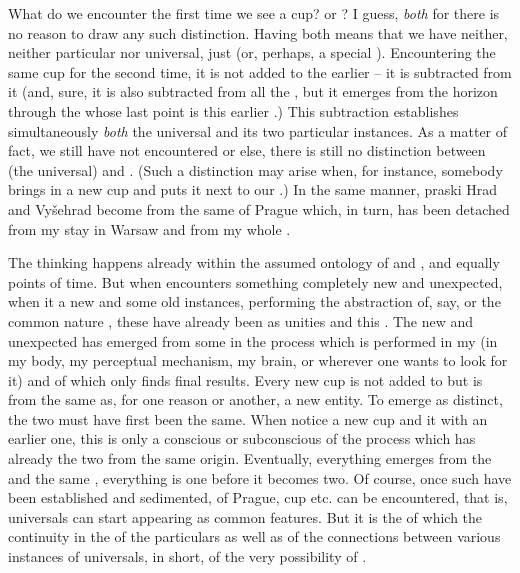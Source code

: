 What do we encounter the first time we see a cup?  or ?
I guess, {\em both} for there is no reason to draw any such distinction. Having
both means that we have neither, neither particular nor universal, just
 (or, perhaps, a special ). Encountering the same cup for the
second time, it is not added to 
the earlier  -- it is subtracted from it (and, sure, it is also
subtracted from all the , but it emerges from the horizon through the
 whose last point is this earlier .)
This subtraction
establishes simultaneously {\em both} the universal  and its two
particular instances.  As a matter of fact, we still have not encountered
 or else, there is still no distinction between (the universal)
 and . (Such a distinction may arise when, for instance,
somebody brings in a new cup and puts it next to our .)  
In the same manner, praski Hrad and Vy\v{s}ehrad become
 from the same  of Prague which, in turn, has been
detached from my stay in Warsaw and from my whole .

The  thinking happens already within the assumed ontology of
 and , and equally 
points of time.  But when  encounters something completely new
and unexpected, when it  a new and some old instances, performing the
abstraction of, say,  or the common nature , these have
already been  as unities  and  this
. The  new and unexpected has emerged from
some  in the process which is performed in my  (in my
body, my perceptual mechanism, my brain, or wherever one wants to look for it)
and of which  only finds final results.  Every new cup is not
added to but is  from the same  as, for one reason
or another, a new entity. To emerge as distinct, the two must have first been
the same. When  notice a new cup and  it with an earlier
one, this is only a conscious or subconscious  of the process
which has already  the two from the same origin.  Eventually,
everything emerges from the  and the same , everything is
one before it becomes two.  Of course, once such  have been
established and sedimented,  of Prague, cup etc. can be
encountered, that 
is, universals can start appearing as common features.  But it is the 
of  which  the continuity in the  of
the particulars as well as of the connections between various instances of
universals, in short, of the very possibility of 
. 

